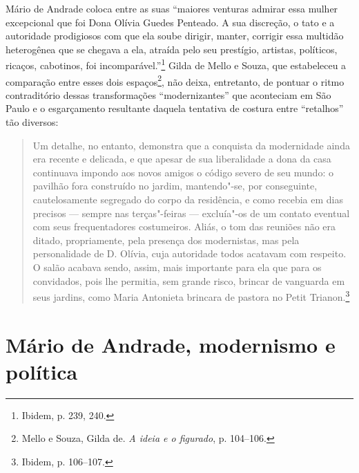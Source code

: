 

Mário de Andrade coloca entre as suas ``maiores venturas admirar essa
mulher excepcional que foi Dona Olívia Guedes Penteado. A sua discreção,
o tato e a autoridade prodigiosos com que ela soube dirigir, manter,
corrigir essa multidão heterogênea que se chegava a ela, atraída pelo
seu prestígio, artistas, políticos, ricaços, cabotinos, foi
incomparável.''\footnote{Ibidem, p. 239, 240.} Gilda de Mello e Souza,
que estabeleceu a comparação entre esses dois espaços\footnote{Mello e
  Souza, Gilda de. \emph{A ideia e o figurado}, p. 104--106.}, não
deixa, entretanto, de pontuar o ritmo contraditório dessas
transformações ``modernizantes'' que aconteciam em São Paulo e o
esgarçamento resultante daquela tentativa de costura entre ``retalhos''
tão diversos:

\begin{quote}
Um detalhe, no entanto, demonstra que a conquista da modernidade ainda
era recente e delicada, e que apesar de sua liberalidade a dona da casa
continuava impondo aos novos amigos o código severo de seu mundo: o
pavilhão fora construído no jardim, mantendo"-se, por conseguinte,
cautelosamente segregado do corpo da residência, e como recebia em dias
precisos --- sempre nas terças"-feiras --- excluía"-os de um contato
eventual com seus frequentadores costumeiros. Aliás, o tom das reuniões
não era ditado, propriamente, pela presença dos modernistas, mas pela
personalidade de D. Olívia, cuja autoridade todos acatavam com respeito.
O salão acabava sendo, assim, mais importante para ela que para os
convidados, pois lhe permitia, sem grande risco, brincar de vanguarda em
seus jardins, como Maria Antonieta brincara de pastora no Petit
Trianon.\footnote{Ibidem, p. 106--107.}
\end{quote}

\section*{Mário de Andrade, modernismo e política}

